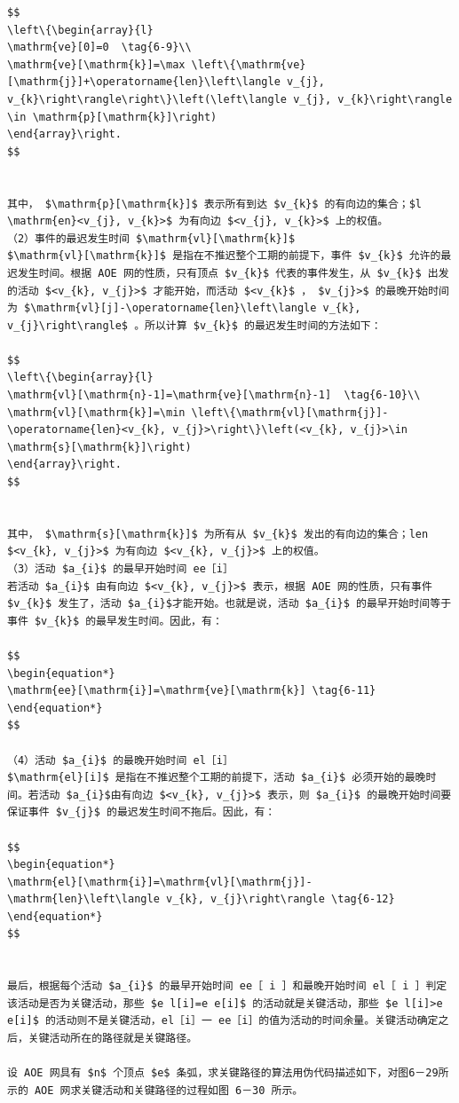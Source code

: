 \documentclass[10pt]{article}
\begin{document}
\begin{verbatim}
$$
\left\{\begin{array}{l}
\mathrm{ve}[0]=0  \tag{6-9}\\
\mathrm{ve}[\mathrm{k}]=\max \left\{\mathrm{ve}[\mathrm{j}]+\operatorname{len}\left\langle v_{j}, v_{k}\right\rangle\right\}\left(\left\langle v_{j}, v_{k}\right\rangle \in \mathrm{p}[\mathrm{k}]\right)
\end{array}\right.
$$


其中， $\mathrm{p}[\mathrm{k}]$ 表示所有到达 $v_{k}$ 的有向边的集合；$l \mathrm{en}<v_{j}, v_{k}>$ 为有向边 $<v_{j}, v_{k}>$ 上的权值。
（2）事件的最迟发生时间 $\mathrm{vl}[\mathrm{k}]$
$\mathrm{vl}[\mathrm{k}]$ 是指在不推迟整个工期的前提下，事件 $v_{k}$ 允许的最迟发生时间。根据 AOE 网的性质，只有顶点 $v_{k}$ 代表的事件发生，从 $v_{k}$ 出发的活动 $<v_{k}, v_{j}>$ 才能开始，而活动 $<v_{k}$ ， $v_{j}>$ 的最晚开始时间为 $\mathrm{vl}[j]-\operatorname{len}\left\langle v_{k}, v_{j}\right\rangle$ 。所以计算 $v_{k}$ 的最迟发生时间的方法如下：

$$
\left\{\begin{array}{l}
\mathrm{vl}[\mathrm{n}-1]=\mathrm{ve}[\mathrm{n}-1]  \tag{6-10}\\
\mathrm{vl}[\mathrm{k}]=\min \left\{\mathrm{vl}[\mathrm{j}]-\operatorname{len}<v_{k}, v_{j}>\right\}\left(<v_{k}, v_{j}>\in \mathrm{s}[\mathrm{k}]\right)
\end{array}\right.
$$


其中， $\mathrm{s}[\mathrm{k}]$ 为所有从 $v_{k}$ 发出的有向边的集合；len $<v_{k}, v_{j}>$ 为有向边 $<v_{k}, v_{j}>$ 上的权值。
（3）活动 $a_{i}$ 的最早开始时间 ee［i］
若活动 $a_{i}$ 由有向边 $<v_{k}, v_{j}>$ 表示，根据 AOE 网的性质，只有事件 $v_{k}$ 发生了，活动 $a_{i}$才能开始。也就是说，活动 $a_{i}$ 的最早开始时间等于事件 $v_{k}$ 的最早发生时间。因此，有：

$$
\begin{equation*}
\mathrm{ee}[\mathrm{i}]=\mathrm{ve}[\mathrm{k}] \tag{6-11}
\end{equation*}
$$

（4）活动 $a_{i}$ 的最晚开始时间 el［i］
$\mathrm{el}[i]$ 是指在不推迟整个工期的前提下，活动 $a_{i}$ 必须开始的最晚时间。若活动 $a_{i}$由有向边 $<v_{k}, v_{j}>$ 表示，则 $a_{i}$ 的最晚开始时间要保证事件 $v_{j}$ 的最迟发生时间不拖后。因此，有：

$$
\begin{equation*}
\mathrm{el}[\mathrm{i}]=\mathrm{vl}[\mathrm{j}]-\mathrm{len}\left\langle v_{k}, v_{j}\right\rangle \tag{6-12}
\end{equation*}
$$


最后，根据每个活动 $a_{i}$ 的最早开始时间 ee［ i ］和最晚开始时间 el［ i ］判定该活动是否为关键活动，那些 $e l[i]=e e[i]$ 的活动就是关键活动，那些 $e l[i]>e e[i]$ 的活动则不是关键活动，el［i］一 ee［i］的值为活动的时间余量。关键活动确定之后，关键活动所在的路径就是关键路径。

设 AOE 网具有 $n$ 个顶点 $e$ 条弧，求关键路径的算法用伪代码描述如下，对图6－29所示的 AOE 网求关键活动和关键路径的过程如图 6－30 所示。
\end{verbatim}
\end{document}
